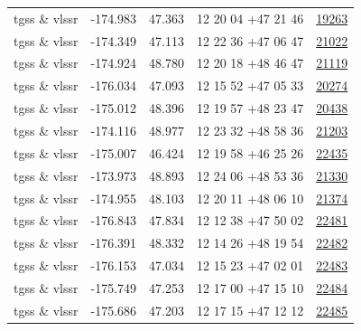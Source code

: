 \documentclass{article}
\begin{document}
\begin{longtable}{c|c|c|c|c}
tgss \& vlssr & -174.983 & 47.363 & 12 20 04 +47 21 46 &  \href{http://banana.transientskp.org/r4/vlo_KmeulenTrap4P23/runningcatalog/19263}{19263} \\
tgss \& vlssr & -174.349 & 47.113 & 12 22 36 +47 06 47 &  \href{http://banana.transientskp.org/r4/vlo_KmeulenTrap4P23/runningcatalog/21022}{21022} \\
tgss \& vlssr & -174.924 & 48.780 & 12 20 18 +48 46 47 &  \href{http://banana.transientskp.org/r4/vlo_KmeulenTrap4P23/runningcatalog/21119}{21119} \\
tgss \& vlssr & -176.034 & 47.093 & 12 15 52 +47 05 33 &  \href{http://banana.transientskp.org/r4/vlo_KmeulenTrap4P23/runningcatalog/20274}{20274} \\
tgss \& vlssr & -175.012 & 48.396 & 12 19 57 +48 23 47 &  \href{http://banana.transientskp.org/r4/vlo_KmeulenTrap4P23/runningcatalog/20438}{20438} \\
tgss \& vlssr & -174.116 & 48.977 & 12 23 32 +48 58 36 &  \href{http://banana.transientskp.org/r4/vlo_KmeulenTrap4P23/runningcatalog/21203}{21203} \\
tgss \& vlssr & -175.007 & 46.424 & 12 19 58 +46 25 26 &  \href{http://banana.transientskp.org/r4/vlo_KmeulenTrap4P23/runningcatalog/22435}{22435} \\
tgss \& vlssr & -173.973 & 48.893 & 12 24 06 +48 53 36 &  \href{http://banana.transientskp.org/r4/vlo_KmeulenTrap4P23/runningcatalog/21330}{21330} \\
tgss \& vlssr & -174.955 & 48.103 & 12 20 11 +48 06 10 &  \href{http://banana.transientskp.org/r4/vlo_KmeulenTrap4P23/runningcatalog/21374}{21374} \\
tgss \& vlssr & -176.843 & 47.834 & 12 12 38 +47 50 02 &  \href{http://banana.transientskp.org/r4/vlo_KmeulenTrap4P23/runningcatalog/22481}{22481} \\
tgss \& vlssr & -176.391 & 48.332 & 12 14 26 +48 19 54 &  \href{http://banana.transientskp.org/r4/vlo_KmeulenTrap4P23/runningcatalog/22482}{22482} \\
tgss \& vlssr & -176.153 & 47.034 & 12 15 23 +47 02 01 &  \href{http://banana.transientskp.org/r4/vlo_KmeulenTrap4P23/runningcatalog/22483}{22483} \\
tgss \& vlssr & -175.749 & 47.253 & 12 17 00 +47 15 10 &  \href{http://banana.transientskp.org/r4/vlo_KmeulenTrap4P23/runningcatalog/22484}{22484} \\
tgss \& vlssr & -175.686 & 47.203 & 12 17 15 +47 12 12 &  \href{http://banana.transientskp.org/r4/vlo_KmeulenTrap4P23/runningcatalog/22485}{22485} \\

\end{longtable}
\end{document}
